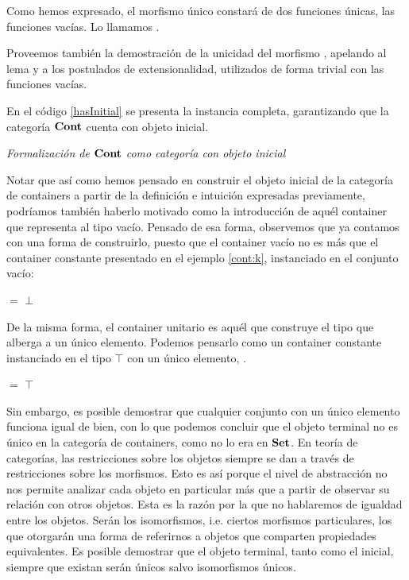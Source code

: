 
Como hemos expresado, el morfismo único constará de dos funciones únicas, las funciones vacías. Lo llamamos .


Proveemos también la demostración de la unicidad del morfismo , apelando al lema  y a los postulados de extensionalidad, utilizados de forma trivial con las funciones vacías. 



En el código \ref{hasInitial} se presenta la instancia completa, garantizando que la categoría $\mathbf{Cont}$ cuenta con objeto inicial. 

\begin{agdacode}{\it Formalización de $\mathbf{Cont}$ como categoría con objeto inicial} \label{hasInitial}

\end{agdacode}


Notar que así como hemos pensado en construir el objeto inicial de la categoría de containers a partir de la definición e intuición expresadas previamente, podríamos también haberlo motivado como la introducción de aquél container que representa al tipo vacío. Pensado de esa forma, observemos que ya contamos con una forma de construirlo, puesto que el container vacío no es más que el container constante presentado en el ejemplo \ref{cont:k}, instanciado en el conjunto vacío:

\sangrar
{} $=$  $\bot$


De la misma forma, el container unitario es aquél que construye el tipo que alberga a un único elemento. Podemos pensarlo como un container constante instanciado en el tipo $\top$ con un único elemento, .

\sangrar
{} $=$  $\top$

Sin embargo, es posible demostrar que cualquier conjunto con un único elemento funciona igual de bien, con lo que podemos concluir que el objeto terminal no es único en la categoría de containers, como no lo era en $\mathbf{Set}$.
En teoría de categorías, las restricciones sobre los objetos siempre se dan a través de restricciones sobre los morfismos.
Esto es así porque el nivel de abstracción no nos permite analizar cada objeto en particular más que a partir de observar su relación con otros objetos. Esta es la razón por la que no hablaremos de igualdad entre los objetos. Serán los isomorfismos, i.e. ciertos morfismos particulares, los que otorgarán una forma de referirnos a objetos que comparten propiedades equivalentes.   
Es posible demostrar que el objeto terminal, tanto como el inicial, siempre que existan serán únicos salvo isomorfismos únicos.

